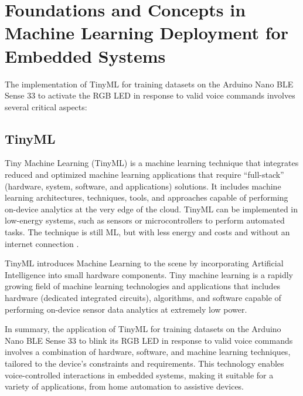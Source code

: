 %
%

\chapter{Foundations and Concepts in Machine Learning Deployment for Embedded Systems}
The implementation of TinyML for training datasets on the Arduino Nano BLE Sense 33 to activate the RGB LED in response to valid voice commands involves several critical aspects:

\section{TinyML}
Tiny Machine Learning (TinyML) is a machine learning technique that integrates reduced and optimized machine learning applications that require “full-stack” (hardware, system, software, and applications) solutions. It includes machine learning architectures, techniques, tools, and approaches capable of performing on-device analytics at the very edge of the cloud. TinyML can be implemented in low-energy systems, such as sensors or microcontrollers to perform automated tasks. The technique is still ML, but with less energy and costs and without an internet connection \cite{Ribeiro:2020}.

TinyML introduces Machine Learning to the scene by incorporating Artificial Intelligence into small hardware components. Tiny machine learning is a rapidly growing field of machine learning technologies and applications that includes hardware (dedicated integrated circuits), algorithms, and software capable of performing on-device sensor data analytics at extremely low power.

In summary, the application of TinyML for training datasets on the Arduino Nano BLE Sense 33 to blink its RGB LED in response to valid voice commands involves a combination of hardware, software, and machine learning techniques, tailored to the device's constraints and requirements. This technology enables voice-controlled interactions in embedded systems, making it suitable for a variety of applications, from home automation to assistive devices\cite{Mishra:2023}.


